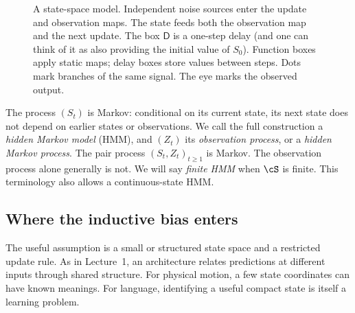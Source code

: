 \documentclass[11pt,twoside]{article}
\theoremstyle{definition}
\theoremstyle{remark}
\begin{document}
\begin{figure}[htbp]
\centering
{}
\caption{A state-space model. Independent noise sources enter the update
and observation maps. The state feeds both the observation map and the
next update. The box \(\mathsf D\) is a one-step delay (and one can think of it as
also providing the initial value of
\(S_0\)). Function boxes apply static maps; delay boxes store values between steps.
Dots mark branches of the same signal. The eye marks the observed output.}
\label{fig:ssm}
\end{figure}

The process \((S_t)\) is Markov: conditional on its current state, its
next state does not depend on earlier states or observations.
We call the full construction a \emph{hidden Markov model} (HMM), and
\((Z_t)\) its \emph{observation process}, or a \emph{hidden Markov process}.
The pair process \((S_t,Z_t)_{t\ge1}\) is Markov. The observation process
alone generally is not. We will say \emph{finite HMM} when \(\cS\) is
finite. This terminology also allows a continuous-state HMM.

\subsection{Where the inductive bias enters}

The useful assumption is a small or structured state space and a
restricted update rule. As in Lecture~1, an architecture relates
predictions at different inputs through shared structure.
For physical motion, a few state coordinates can have known meanings.
For language, identifying a useful compact state is itself a learning
problem.
\end{document}
